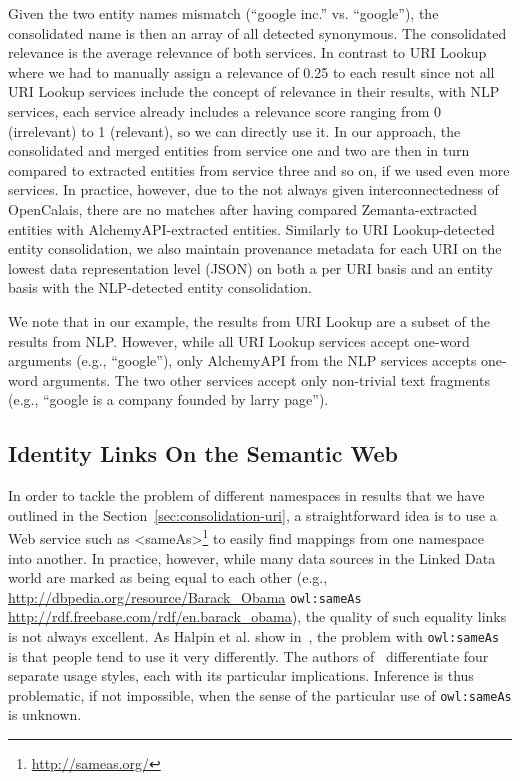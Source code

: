 \documentclass{acm_proc_article-sp}
\begin{document}
Given the two entity names mismatch (``google inc.'' vs. ``google''), the consolidated name is then an array of all
detected synonymous. The consolidated relevance is the average relevance of both services. In contrast to URI Lookup
where we had to manually assign a relevance of 0.25 to each result since not all URI Lookup services include the
concept of relevance in their results, with NLP services, each service already includes a relevance score ranging from
0 (irrelevant) to 1 (relevant), so we can directly use it. In our approach, the consolidated and merged entities from
service one and two are then in turn compared to extracted entities from service three and so on, if we used even more
services. In practice, however, due to the not always given interconnectedness of OpenCalais, there are no matches
after having compared Zemanta-extracted entities with AlchemyAPI-extracted entities. Similarly to URI Lookup-detected
entity consolidation, we also maintain provenance metadata for each URI on the lowest data representation level (JSON)
on both a per URI basis and an entity basis with the NLP-detected entity consolidation.

We note that in our example, the results from URI Lookup are a subset of the results from NLP. However, while all URI
Lookup services accept one-word arguments (e.g., ``google''), only AlchemyAPI from the NLP services accepts one-word
arguments. The two other services accept only non-trivial text fragments (e.g., ``google is a company founded by larry
page'').

\subsection{Identity Links On the Semantic Web}                             \label{sec:sameasorg}
In order to tackle the problem of different namespaces in results that we have outlined in the
Section~\ref{sec:consolidation-uri}, a straightforward idea is to use a Web service such as
<sameAs>\footnote{\url{http://sameas.org/}} to easily find mappings from one namespace into another. In practice,
however, while many data sources in the Linked Data world are marked as being equal to each other (e.g.,
\url{http://dbpedia.org/resource/Barack_Obama} \texttt{owl:sameAs} \url{http://rdf.freebase.com/rdf/en.barack_obama}),
the quality of such equality links is not always excellent. As Halpin et al. show in~\cite{Halpin:SameAs}, the problem
with \texttt{owl:sameAs} is that people tend to use it very differently. The authors of~\cite{Halpin:SameAs}
differentiate four separate usage styles, each with its particular implications. Inference is thus problematic, if not
impossible, when the sense of the particular use of \texttt{owl:sameAs} is unknown.
\end{document}

